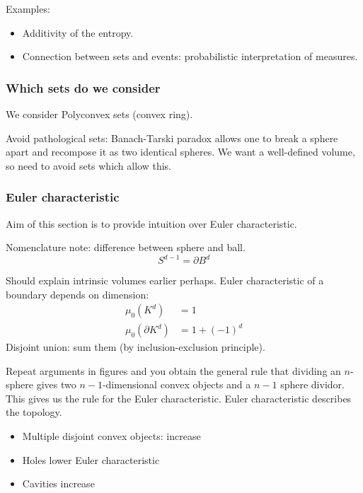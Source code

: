 Examples:
\begin{itemize}
\item Additivity of the entropy.
\item Connection between sets and events: probabilistic interpretation of measures.
\end{itemize}

\subsubsection{Which sets do we consider}

We consider Polyconvex sets (convex ring).

Avoid pathological sets: Banach-Tarski paradox allows one to break a sphere apart and recompose it as two identical spheres.
We want a well-defined volume, so need to avoid sets which allow this.

\subsubsection{Euler characteristic}

Aim of this section is to provide intuition over Euler characteristic.

\begin{tcolorbox}
  Nomenclature note: difference between sphere and ball.
  \begin{equation*}
    S^{d-1} = \partial B^d
  \end{equation*}
\end{tcolorbox}

Should explain intrinsic volumes earlier perhaps.
Euler characteristic of a boundary depends on dimension:
\begin{align}
  \mu_0(K^d) &= 1 \\
  \mu_0(\partial K^d) &= 1 + (-1)^d
\end{align}
Disjoint union: sum them (by inclusion-exclusion principle).

Repeat arguments in figures and you obtain the general rule that dividing an $n$-sphere gives two $n-1$-dimensional convex objects and a $n-1$ sphere dividor.
This gives us the rule for the Euler characteristic.
Euler characteristic describes the topology.

\begin{itemize}
\item Multiple disjoint convex objects: increase
\item Holes lower Euler characteristic
\item Cavities increase
\end{itemize}

